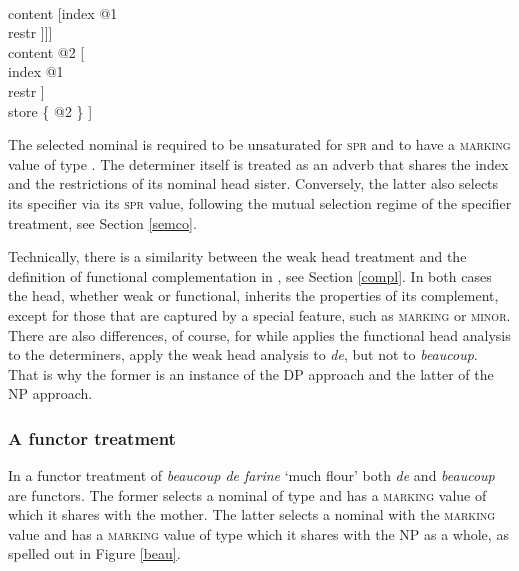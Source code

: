 \documentclass[output=paper
                ,modfonts
                ,nonflat
	        ,collection
	        ,collectionchapter
	        ,collectiontoclongg
 	        ,biblatex
                ,babelshorthands
                ,newtxmath
                ,draftmode
                ,colorlinks, citecolor=brown
]{./langsci/langscibook}
\begin{document}
\begin{exe} 
\ex\label{coup} 
\begin{avm} 
[category|head [\type{adverb}                                 \\
                spec|loc [category [head    & \type{noun}     \\
                                    spr     & <X>             \\
                                    marking & \type{de}]      \\
                          content [index @1                    \\
                                   restr \avmbox{$\Sigma$} ]]] \\ 
 content @2 [         \\
               index @1                  \\
               restr \avmbox{$\Sigma$} ] \\
 store \{ @2 \} ]
\end{avm}
\end{exe} 

\noindent
The selected nominal is required to be unsaturated for \textsc{spr} and to have a 
\textsc{marking} value of type . The determiner itself is treated as an adverb that  
shares the index and the restrictions of its nominal head sister. Conversely, the latter
also selects its specifier via its \textsc{spr} value, following the mutual 
selection regime of the specifier treatment, see Section \ref{semco}.

Technically, there is a similarity between the weak head treatment and the 
definition of functional complementation in \citet{Netter94}, see Section \ref{compl}. 
In both cases the head, whether weak or functional, inherits the properties of its 
complement, except for those that are captured by a special feature, such as  
\textsc{marking} or \textsc{minor}. There are also differences, of course, for 
while \citet{Netter94} applies the functional head analysis to the determiners,  
\citet{Abeilleetal04} apply the weak head analysis to \emph{de}, but not to 
\emph{beaucoup}. That is why the former is an instance of the DP approach and the 
latter of the NP approach.  


\subsubsection{A functor treatment} 


In a functor treatment of \emph{beaucoup de farine} `much flour' both \emph{de} and 
\emph{beaucoup} are functors. The former selects a nominal of type  and 
has a \textsc{marking} value of  which it shares with the mother. 
The latter selects a nominal with the \textsc{marking} value 
 and has a \textsc{marking} value of type  which it 
shares with the NP as a whole, as spelled out in Figure \ref{beau}. 
\end{document}
